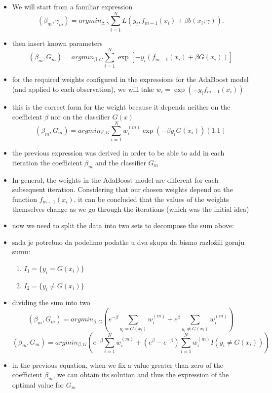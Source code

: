 \documentclass[12pt, letterpaper, twoside]{article}
\begin{document}
\begin{itemize}
\item We will start from a familiar expression
\begin{equation*}
(\beta_m,\gamma_m)=argmin_{\beta,\gamma}\sum_{i=1}^N L(y_i,f_{m-1}(x_i)+\beta b(x_i;\gamma)).
\end{equation*}
\item then insert known parameters
\begin{equation*}
(\beta_m,G_m)=argmin_{\beta,G}\sum_{i=1}^N \exp[-y_i(f_{m-1}(x_i)+\beta G(x_i))]
\end{equation*}
\item for the required weights configured in the expressions for the AdaBoost model (and applied to each observation), we will take $w_i=\exp(-y_i f_{m-1}(x_i))$
\item this is the correct form for the weight because it depends neither on the coefficient $\beta$ nor on the classifier $G(x)$
\begin{equation*}
(\beta_m,G_m)=argmin_{\beta,G}\sum_{i=1}^N w_i^{(m)} \exp(-\beta  y_i G(x_i)) (1.1)
\end{equation*}
\item the previous expression was derived in order to be able to add in each iteration the coefficient $\beta_m$ and the classifier $G_m$
\item In general, the weights in the AdaBoost model are different for each subsequent iteration. Considering that our chosen weights depend on the function $f_{m-1}(x_i)$, it can be concluded that the values of the weights themselves change as we go through the iterations (which was the initial idea)
\item now we need to split the data into two sets to decompose the sum above:
\item sada je potrebno da podelimo podatke u dva skupa da bismo razložili gornju sumu:
\begin{enumerate}
\item $I_1=\{y_i=G(x_i)\}$ 
\item $I_2=\{y_i\not=G(x_i)\}$
\end{enumerate}
\item dividing the sum into two
\begin{equation*}
(\beta_m,G_m)=argmin_{\beta,G}(e^{-\beta}\sum_{y_i=G(x_i)} w_i^{(m)} +e^{\beta}\sum_{y_i\not=G(x_i)}w_i^{(m)})
\end{equation*}
\begin{equation*}
(\beta_m,G_m)=argmin_{\beta,G}(e^{-\beta}\sum_{i=1}^N w_i^{(m)} +(e^{\beta}-e^{-\beta})\sum_{i=1}^N w_i^{(m)}I(y_i\not=G(x_i)))
\end{equation*}
\item in the previous equation, when we fix a value greater than zero of the coefficient $\beta_m$, we can obtain its solution and thus the expression of the optimal value for $G_m$
\end{itemize}
\end{document}
